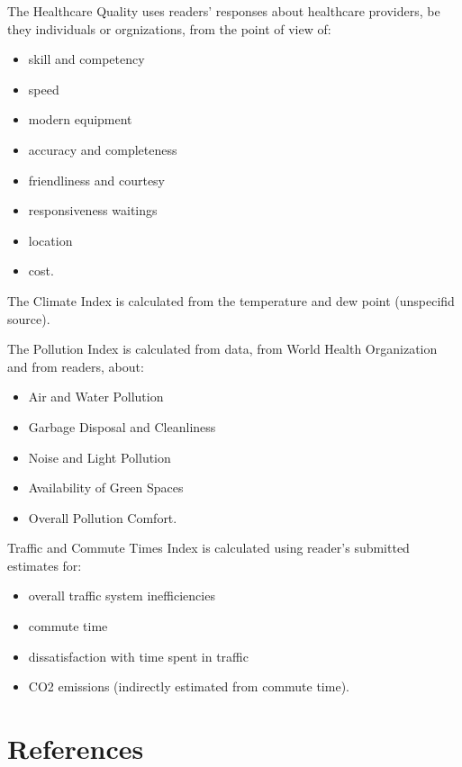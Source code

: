 \documentclass[
  english,
  12pt,
  a4paper,
]{scrartcl}
\providecommand{\tightlist}{%
  \setlength{\itemsep}{0pt}\setlength{\parskip}{0pt}}
\begin{document}
The Healthcare Quality uses readers' responses about healthcare
providers, be they individuals or orgnizations, from the point of view
of:

\begin{itemize}
\tightlist
\item
  skill and competency
\item
  speed
\item
  modern equipment
\item
  accuracy and completeness
\item
  friendliness and courtesy
\item
  responsiveness waitings
\item
  location
\item
  cost.
\end{itemize}

The Climate Index is calculated from the temperature and dew point
(unspecifid source).

The Pollution Index is calculated from data, from World Health
Organization and from readers, about:

\begin{itemize}
\tightlist
\item
  Air and Water Pollution
\item
  Garbage Disposal and Cleanliness
\item
  Noise and Light Pollution
\item
  Availability of Green Spaces
\item
  Overall Pollution Comfort.
\end{itemize}

Traffic and Commute Times Index is calculated using reader's submitted
estimates for:

\begin{itemize}
\tightlist
\item
  overall traffic system inefficiencies
\item
  commute time
\item
  dissatisfaction with time spent in traffic
\item
  CO2 emissions (indirectly estimated from commute time).
\end{itemize}

\section*{References}\label{references}
\end{document}
